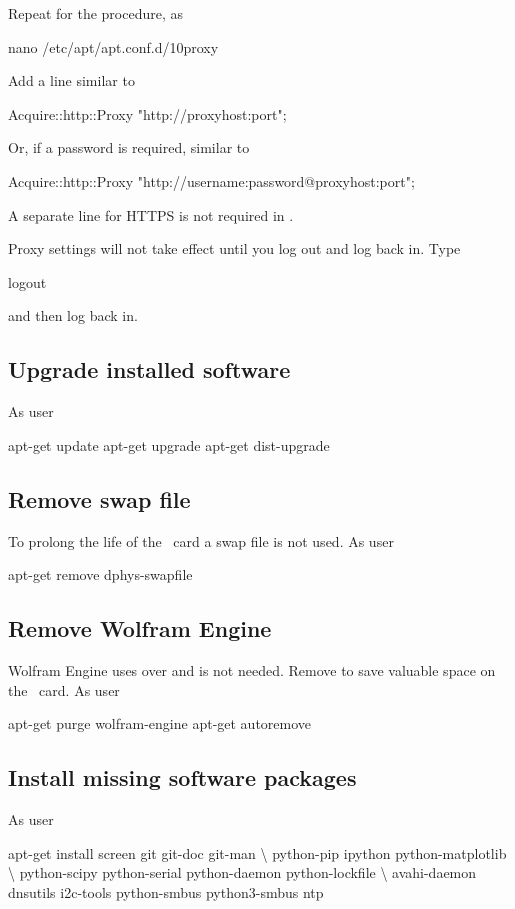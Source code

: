 Repeat for the procedure, as \rootUser
\begin{Cmd}
nano /etc/apt/apt.conf.d/10proxy
\end{Cmd}

Add a line similar to
\begin{Cmd}
Acquire::http::Proxy "http://proxyhost:port";
\end{Cmd}
Or, if a password is required, similar to
\begin{Cmd}
Acquire::http::Proxy "http://username:password@proxyhost:port";
\end{Cmd}
A separate line for HTTPS is not required in
.

Proxy settings will not take effect until you log out and log back
in. Type
\begin{Cmd}
logout
\end{Cmd}
and then log back in.

\subsection{Upgrade installed software}
As user \rootUser
\begin{Cmd}
apt-get update
apt-get upgrade
apt-get dist-upgrade
\end{Cmd}

\subsection{Remove swap file}
To prolong the life of the \sd\ card a swap file is not used. As user
\rootUser
\begin{Cmd}
apt-get remove dphys-swapfile  
\end{Cmd}

\subsection{Remove Wolfram Engine}
Wolfram Engine uses over  and is not needed. Remove to save
valuable space on the \sd\ card. As user \rootUser
\begin{Cmd}
apt-get purge wolfram-engine
apt-get autoremove
\end{Cmd}


\subsection{Install missing software packages}
As user \rootUser
\begin{Cmd}
apt-get install screen git git-doc git-man \textbackslash
    python-pip ipython python-matplotlib \textbackslash
    python-scipy python-serial python-daemon python-lockfile \textbackslash
    avahi-daemon dnsutils i2c-tools python-smbus python3-smbus ntp
\end{Cmd}

